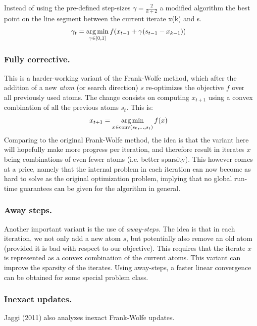 Instead of using the pre-defined step-sizes $\gamma=\frac{2}{k+2}$ a modified algorithm the best point on the line segment between the current iterate x(k) and s.
\begin{equation}
\gamma_t = \operatorname*{arg\,min}_{\gamma \in [0,1]} f( x_{t-1} + \gamma(s_{t-1}-x_{k-1}) ) \nonumber
\end{equation}

\subsubsection{Fully corrective.}

This is a harder-working variant of the Frank-Wolfe method, which after the addition of a new \emph{atom} (or search direction) $s$ re-optimizes the objective $f$ over all previously used atoms. The change consists on computing $x_{t+1}$ using a convex combination of all the previous atoms $s_t$. This is:
\begin{equation}
x_{t+1} = \operatorname*{arg\,min}_{x \in \text{conv}(s_0,\ldots,s_{t}) } f(x)
\end{equation}
Comparing to the original Frank-Wolfe method, the idea is that the variant here will hopefully make more progress per iteration, and therefore result in iterates $x$ being combinations of even fewer atoms (i.e. better sparsity). This however comes at a price, namely that the internal problem in each iteration can now become as hard to solve as the original optimization problem, implying that no global run-time guarantees can be given for the algorithm in general.

\subsubsection{Away steps.}
Another important variant is the use of \emph{away-steps}. The idea is that in each iteration, we not only add a new atom $s$, but potentially also remove an old atom (provided it is bad with respect to our objective). This requires that the iterate $x$ is represented as a convex combination of the current atoms. This variant can improve the sparsity of the iterates. Using away-steps, a faster linear convergence can be obtained for some special problem class.

\subsubsection{Inexact updates.}
Jaggi (2011) also analyzes inexact Frank-Wolfe updates.

